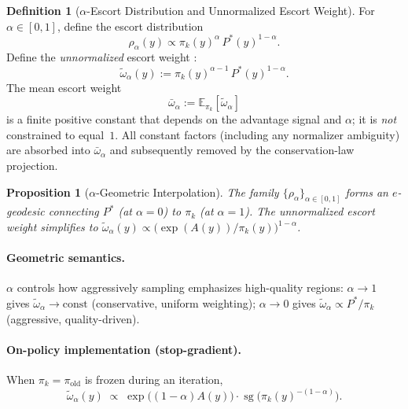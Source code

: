 \documentclass[11pt]{article}
\newtheorem{proposition}[theorem]{Proposition}
\theoremstyle{definition}
\newtheorem{definition}[theorem]{Definition}
\theoremstyle{remark}
\newcommand{\E}{\mathbb{E}}
\DeclareMathOperator{\sg}{sg}
\newcommand{\pik}{\pi_k}
\begin{document}
\begin{definition}[$\alpha$-Escort Distribution and Unnormalized Escort Weight]
\label{def:target}
For $\alpha\in[0,1]$, define the escort distribution
\begin{equation}
\label{eq:escort_def}
\rho_\alpha(y) \propto \pik(y)^\alpha\,P^*(y)^{1-\alpha}.
\end{equation}
Define the \emph{unnormalized} escort weight :
\begin{equation}
\label{eq:omega_alpha}
\tilde{\omega}_\alpha(y) := \pik(y)^{\alpha-1}\,P^*(y)^{1-\alpha}.
\end{equation}
The mean escort weight
\begin{equation}
\label{eq:omega_mean}
\bar{\omega}_\alpha := \E_{\pik}[\tilde{\omega}_\alpha]
\end{equation}
is a finite positive constant that depends on the advantage signal and $\alpha$; it is \emph{not} constrained to equal~$1$. All constant factors (including any normalizer ambiguity) are absorbed into $\bar{\omega}_\alpha$ and subsequently removed by the conservation-law projection.
\end{definition}

\begin{proposition}[$\alpha$-Geometric Interpolation]
\label{prop:alpha_mixture}
The family $\{\rho_\alpha\}_{\alpha \in [0,1]}$ forms an $e$-geodesic connecting $P^*$ (at $\alpha=0$) to $\pik$ (at $\alpha=1$).
The unnormalized escort weight simplifies to $\tilde{\omega}_\alpha(y) \propto \bigl(\exp(A(y))/\pik(y)\bigr)^{1-\alpha}$.
\end{proposition}

\paragraph{Geometric semantics.}
$\alpha$ controls how aggressively sampling emphasizes high-quality regions:
$\alpha\to 1$ gives $\tilde{\omega}_\alpha\to \text{const}$ (conservative, uniform weighting);
$\alpha\to 0$ gives $\tilde{\omega}_\alpha \propto P^*/\pik$ (aggressive, quality-driven).

\paragraph{On-policy implementation (stop-gradient).}
When $\pik=\pi_{\mathrm{old}}$ is frozen during an iteration,
\begin{equation}
\label{eq:omega_approx}
\tilde{\omega}_\alpha(y)
\;\propto\;
\exp\!\big((1-\alpha)A(y)\big)\cdot
\sg\!\Big(\pik(y)^{-(1-\alpha)}\Big).
\end{equation}
\end{document}
